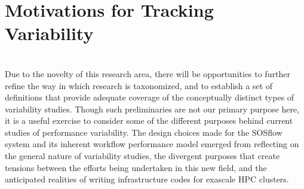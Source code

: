 \section{Motivations for Tracking Variability}
\\
Due to the novelty of this research area, there will be opportunities to 
further refine the way in which research is taxonomized, and to establish 
a set of definitions that provide adequate coverage of the conceptually distinct 
types of variability studies. Though such preliminaries are not our primary 
purpose here, it is a  useful  exercise to consider some of the different 
purposes behind current studies of performance variability. The design choices 
made for the SOSflow system and its inherent workflow performance model emerged 
from reflecting on the general nature of variability studies, the 
divergent purposes that create tensions between the efforts being 
undertaken in this new field, and the anticipated realities of writing 
infrastructure codes for exascale HPC clusters.
